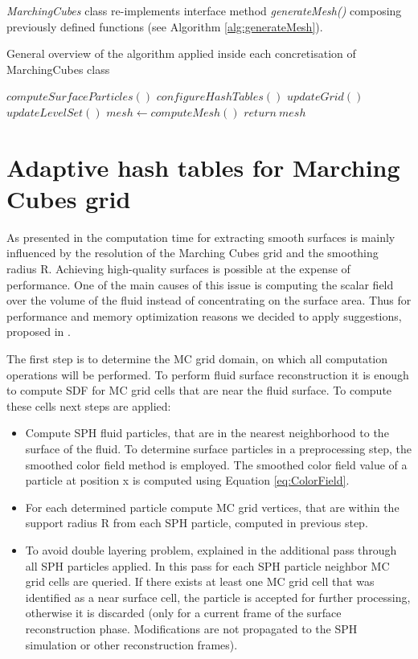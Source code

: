 \emph{MarchingCubes} class re-implements interface method \emph{generateMesh()} composing previously defined functions (see Algorithm \ref{alg:generateMesh}).

\begin{algorithm}
	\scriptsize
	\caption{General overview of the algorithm applied inside each concretisation of MarchingCubes class}
	\label{alg:generateMesh}
	\begin{algorithmic}
		\State $computeSurfaceParticles()$
		\State $configureHashTables()$
		\State $updateGrid()$
		\State $updateLevelSet()$
		\State $mesh \gets computeMesh()$ 
		\State $return\ mesh$
	\end{algorithmic}
\end{algorithm}

\section{Adaptive hash tables for Marching Cubes grid}
As presented in \cite{Akinchi} the computation time for extracting smooth surfaces is mainly influenced by the resolution of the Marching Cubes grid and the smoothing radius R. Achieving high-quality surfaces is possible at the expense of performance. One of the main causes of this issue is computing the scalar field over the volume of the fluid instead of concentrating on the surface area. Thus for performance and memory optimization reasons we decided to apply suggestions, proposed in \cite{Akinchi}.

The first step is to determine the MC grid domain, on which all computation operations will be performed. To perform fluid surface reconstruction it is enough to compute SDF for MC grid cells that are near the fluid surface. To compute these cells next steps are applied:
\begin{itemize}
		\item Compute SPH fluid particles, that are in the nearest neighborhood to the surface of the fluid. To determine surface particles in a preprocessing step, the smoothed color field method \cite{ColorField} is employed.  The smoothed color field value of a particle at position x is computed using Equation \ref{eq:ColorField}.
		\item For each determined particle compute MC grid vertices, that are within the support radius R from each SPH particle, computed in previous step.
		\item To avoid double layering problem, explained in the \cite{Akinchi} additional pass through all SPH particles applied. In this pass for each SPH particle neighbor MC grid cells are queried. If there exists at least one MC grid cell that was identified as a near surface cell, the particle is accepted for further processing, otherwise it is discarded (only for a current frame of the surface reconstruction phase. Modifications are not propagated to the SPH simulation or other reconstruction frames).
\end{itemize}

